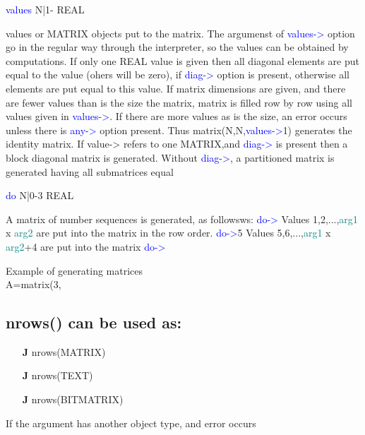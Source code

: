 \vspace{0.3cm}
\hline
\vspace{0.3cm}
\noindent \textcolor{blue}{values} \tabto{3cm} N|1- \tabto{5cm}   REAL  \tabto{7cm}
\begin{changemargin}{3cm}{0cm}
\noindent values or MATRIX objects put to the matrix. The argumenst of
\textcolor{blue}{values->} option go in the regular way
through the interpreter, so the values can be obtained by computations. If only one REAL value is
given then all diagonal elements are put equal to the value (ohers will be zero),
if \textcolor{blue}{diag->} option is present, otherwise all elements are put equal to this value. If matrix dimensions
are given, and there are fewer values than is the size the matrix, matrix is
filled row by row using all values given in
\textcolor{blue}{values->}. If there are more values as is the size, an error occurs unless there is
\textcolor{blue}{any->} option present.
Thus \textcolor{VioletRed}{matrix}(N,N,\textcolor{blue}{values->}1) generates the identity matrix.
If value-> refers to one MATRIX,and \textcolor{blue}{diag->} is present then a block diagonal
matrix is generated. Without \textcolor{blue}{diag->}, a partitioned matrix is generated having all
submatrices equal
\end{changemargin}
\vspace{0.3cm}
\hline
\vspace{0.3cm}
\noindent \textcolor{blue}{do}  \tabto{3cm} N|0-3 \tabto{5cm}  REAL   \tabto{7cm}
\begin{changemargin}{3cm}{0cm}
\noindent  A matrix of number sequences is generated, as followsws: \newline
\textcolor{blue}{do->} Values 1,2,...,\textcolor{teal}{arg1} x \textcolor{teal}{arg2} are put into the matrix in the row order. \newline
\textcolor{blue}{do->}5 Values 5,6,...,\textcolor{teal}{arg1} x \textcolor{teal}{arg2}+4 are put into the matrix \newline
\textcolor{blue}{do->}
\end {changemargin}
\hline
\vspace{0.2cm}
\begin{example}[matrixex]Example of generating matrices\\
\label{matrixex}
A=\textcolor{VioletRed}{matrix}(3,

\end{example}

\subsection{\textcolor{VioletRed}{nrows}() can be used as:}
\label{nrows}
\begin{itemize}
\item[\textbf{J}\.] \textcolor{VioletRed}{nrows}(MATRIX)
\item[\textbf{J}\.] \textcolor{VioletRed}{nrows}(TEXT)
\item[\textbf{J}\.] \textcolor{VioletRed}{nrows}(BITMATRIX)
\end{itemize}
\begin{note}
If the argument has another object type, and error occurs
\end{note}
